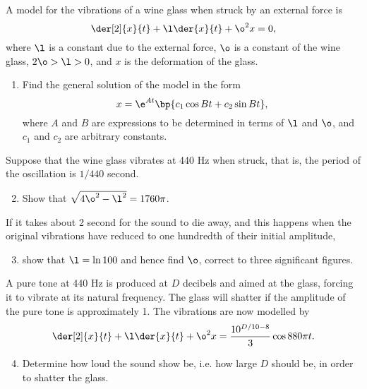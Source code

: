 \begin{problem}[\chili]
    A model for the vibrations of a wine glass when struck by an external force is \[\der[2]{x}{t} + \l \der{x}{t} + \o^2 x = 0,\] where $\l$ is a constant due to the external force, $\o$ is a constant of the wine glass, $2\o > \l > 0$, and $x$ is the deformation of the glass.

    \begin{enumerate}
        \item Find the general solution of the model in the form \[x = \e^{At} \bp{c_1 \cos Bt + c_2 \sin Bt},\] where $A$ and $B$ are expressions to be determined in terms of $\l$ and $\o$, and $c_1$ and $c_2$ are arbitrary constants.
    \end{enumerate}

    Suppose that the wine glass vibrates at 440 Hz when struck, that is, the period of the oscillation is $1/440$ second.

    \begin{enumerate}
        \setcounter{enumi}{1}
        \item Show that $\sqrt{4\o^2 - \l^2} = 1760 \pi$.
    \end{enumerate}

    If it takes about 2 second for the sound to die away, and this happens when the original vibrations have reduced to one hundredth of their initial amplitude,
    \begin{enumerate}
        \setcounter{enumi}{2}
        \item show that $\l = \ln 100$ and hence find $\o$, correct to three significant figures.
    \end{enumerate}

    A pure tone at 440 Hz is produced at $D$ decibels and aimed at the glass, forcing it to vibrate at its natural frequency. The glass will shatter if the amplitude of the pure tone is approximately 1. The vibrations are now modelled by \[\der[2]{x}{t} + \l \der{x}{t} + \o^2 x = \frac{10^{D/10 - 8}}{3} \cos{880\pi t}.\]

    \begin{enumerate}
        \setcounter{enumi}{3}
        \item Determine how loud the sound show be, i.e. how large $D$ should be, in order to shatter the glass.
    \end{enumerate}
\end{problem}